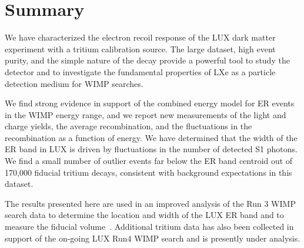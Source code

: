 \section{Summary}

We have characterized the electron recoil response of the LUX dark matter experiment with a tritium calibration source. The large dataset, high event purity, and the simple nature of the decay provide a powerful tool to study the detector and to investigate the fundamental properties of LXe as a particle detection medium for WIMP searches. 

We find strong evidence in support of the combined energy model for ER events in the WIMP energy range, and we report new measurements of the light and charge yields, the average recombination, and the fluctuations in the recombination as a function of energy. We have determined that the width of the ER band in LUX is driven by fluctuations in the number of detected S1 photons. We find a small number of outlier events far below the ER band centroid out of 170,000 fiducial tritium decays, consistent with background expectations in this dataset.

The results presented here are used in an improved analysis of the Run 3 WIMP search data to determine the location and width of the LUX ER band and to measure the fiducial volume~\cite{lux-reanalysis}. Additional tritium data has also been collected in support of the on-going LUX Run4 WIMP search and is presently under analysis.